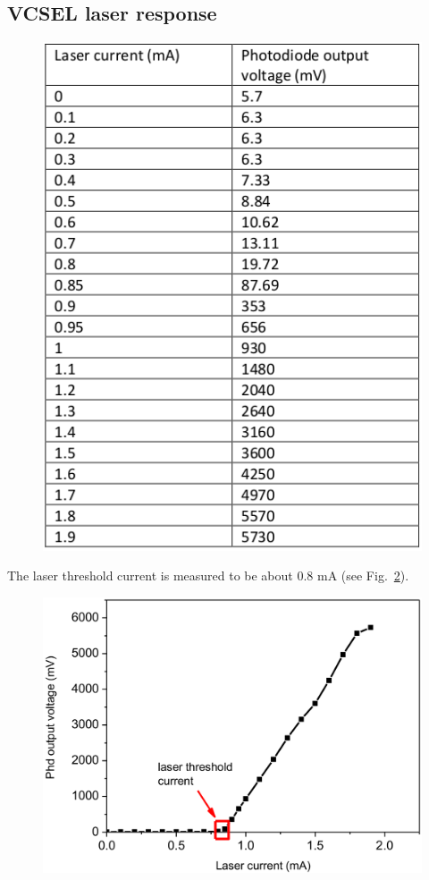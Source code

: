 \documentclass[a4paper,11pt]{article}
\begin{document}
\subsection{VCSEL laser response}
\begin{figure}[h!]
	\centering
	\includegraphics[width=0.6\linewidth]{vcsel-response}
	\caption{}
	\label{fig:vcsel-response}
\end{figure}

The laser threshold current is measured to be about 0.8 mA (see Fig.~\ref{fig:threshold}).
\begin{figure}[h!]
	\centering
	\includegraphics[width=0.5\linewidth]{threshold}
	\caption{}
	\label{fig:threshold}
\end{figure}
\end{document}
